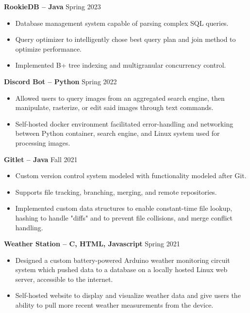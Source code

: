 \documentclass{article}
\begin{document}
    \begin{adjustwidth}{1em}{1em}
        \textbf{RookieDB -- Java} \hfill Spring 2023
        \begin{itemize}
            \item Database management system capable of parsing complex SQL queries.
            \item Query optimizer to intelligently chose best query plan and join method to optimize performance.
            \item Implemented B+ tree indexing and multigranular concurrency control. 
        \end{itemize}

        \vspace{1mm}

        \textbf{Discord Bot -- Python} \hfill Spring 2022
        \begin{itemize}
            \item Allowed users to query images from an aggregated search engine, then manipulate, rasterize, or edit said images through text commands.
            \item Self-hosted docker environment facilitated error-handling and networking between Python container, search engine, and Linux system used for processing images.
        \end{itemize}

        \textbf{Gitlet -- Java} \hfill Fall 2021 
        \begin{itemize}
            \item Custom version control system modeled with functionality modeled after Git.
            \item Supports file tracking, branching, merging, and remote repositories.
            \item Implemented custom data structures to enable constant-time file lookup, hashing to handle "diffs" and to prevent file collisions, and merge conflict handling.
        \end{itemize}

        \vspace{1mm}

        \noindent \textbf{Weather Station -- C, HTML, Javascript} \hfill Spring 2021
        \begin{itemize}
            \item Designed a custom battery-powered Arduino weather monitoring circuit system which pushed data to a database on a locally hosted Linux web server, accessible to the internet. 
            \item Self-hosted website to display and visualize weather data and give users the ability to pull more recent weather measurements from the device.
        \end{itemize}

        
    \end{adjustwidth}
\end{document}
